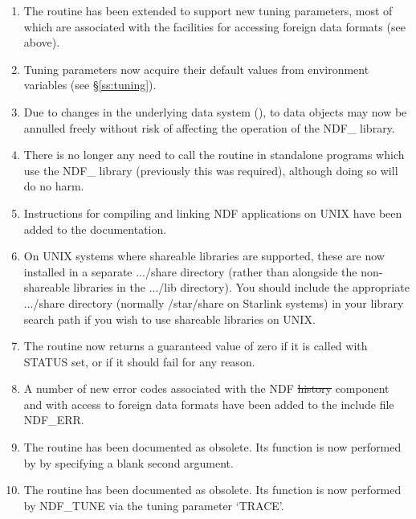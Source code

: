 \begin{enumerate}
\item The routine  has been extended to support new tuning
parameters, most of which are associated with the facilities for
accessing foreign data formats (see above).

\item Tuning parameters now acquire their default values from
environment variables (see \S\ref{ss:tuning}).

\item Due to changes in the underlying data system
(),  to
data objects may now be annulled freely without risk of affecting the
operation of the NDF\_ library.

\item There is no longer any need to call the routine 
in standalone programs which use the NDF\_ library (previously this
was required), although doing so will do no harm.

\item Instructions for compiling and linking NDF applications on
UNIX have been added to the documentation.

\item On UNIX systems where shareable libraries are supported, these
are now installed in a separate .../share directory (rather than
alongside the non-shareable libraries in the .../lib directory). You
should include the appropriate .../share directory (normally
/star/share on Starlink systems) in your library search path if you
wish to use shareable libraries on UNIX.

\item The routine  now returns a guaranteed value of zero if
it is called with STATUS set, or if it should fail for any reason.

\item A number of new error codes associated with the NDF \st{history\/}
component and with access to foreign data formats have been added to
the include file NDF\_ERR.

\item The routine  has been documented as obsolete. Its
function is now performed by  by specifying a blank second
argument.

\item The routine  has been documented as obsolete. Its
function is now performed by NDF\_TUNE via the tuning parameter
`TRACE'.

\end{enumerate}

